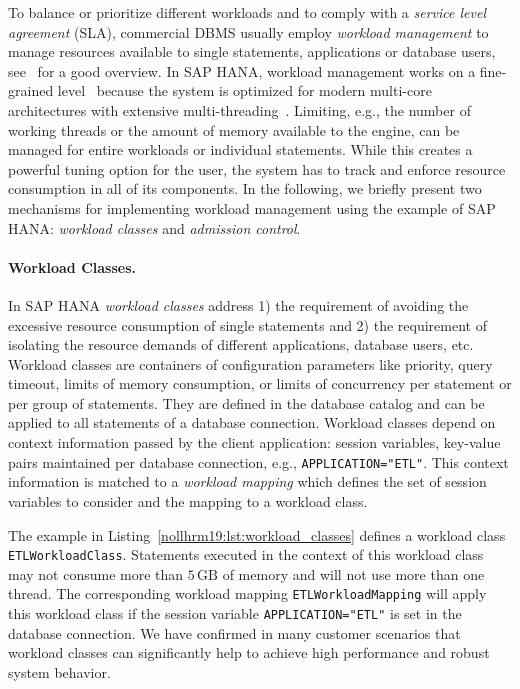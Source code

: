 \documentclass[11pt]{article}
\begin{document}
To balance or prioritize different workloads and to comply with a \emph{service level agreement} (SLA), commercial DBMS usually employ \emph{workload management} to manage resources available to single statements, applications or database users, see~\cite{nollhrm19:Zhang:AWLM:2014} for a good overview.
In SAP HANA, workload management works on a fine-grained level~\cite{nollhrm19:HANA:2018:AdminGuide} because the system is optimized for modern multi-core architectures with extensive multi-threading~\cite{nollhrm19:Psaroudakis:2015:SUC:2824032.2824043}.
Limiting, e.g., the number of working threads or the amount of memory available to the engine, can be managed for entire workloads or individual statements.
While this creates a powerful tuning option for the user, the system has to track and enforce resource consumption in all of its components.
In the following, we briefly present two mechanisms for implementing workload management using the example of SAP HANA: \emph{workload classes} and \emph{admission control}.

\paragraph{Workload Classes.}
In SAP HANA \emph{workload classes} address 1) the requirement of avoiding the excessive resource consumption of single statements and 2) the requirement of isolating the resource demands of different applications, database users, etc.\@
Workload classes are containers of configuration parameters like priority, query timeout, limits of memory consumption, or limits of concurrency per statement or per group of statements.
They are defined in the database catalog and can be applied to all statements of a database connection.
Workload classes depend on context information passed by the client application: session variables, key-value pairs maintained per database connection, e.g., \texttt{APPLICATION="ETL"}.
This context information is matched to a \emph{workload mapping} which defines the set of session variables to consider and the mapping to a workload class.

The example in Listing~\ref{nollhrm19:lst:workload_classes} defines a workload class \texttt{ETLWorkloadClass}.
Statements executed in the context of this workload class may not consume more than $5\,\mathrm{GB}$ of memory and will not use more than one thread.
The corresponding workload mapping \texttt{ETLWorkloadMapping} will apply this workload class if the session variable \texttt{APPLICATION="ETL"} is set in the database connection.
We have confirmed in many customer scenarios that workload classes can significantly help to achieve high performance and robust system behavior.
\end{document}
